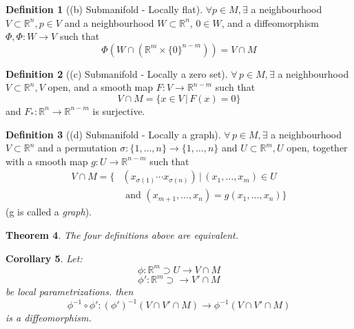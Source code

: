 \documentclass[a4paper,11pt,titlepage]{article}
\numberwithin{equation}{section}
\newtheorem{theorem}{Theorem}[section]
\newtheorem{corollary}[theorem]{Corollary}
\theoremstyle{definition}
\newtheorem{definition}[theorem]{Definition}
\theoremstyle{remark}
\newcommand{\rfield}{\mathbb{R}}
\begin{document}
\begin{definition}[(b) Submanifold - Locally flat]
  $\forall p \in M, \exists$ a neighbourhood $V \subset \rfield^n, p \in V$ and a neighbourhood $W \subset \rfield^n$, $0 \in W$, and a diffeomorphism $\Phi, \Phi \colon W \rightarrow V$ such that
  $$\Phi \left ( W \cap (\rfield^m \times \{0\}^{n-m}) \right ) = V \cap M$$
\end{definition}

\begin{definition}[(c) Submanifold - Locally  a zero set]
$\forall \, p \in M, \exists$ a neighbourhood $V \subset \rfield^n, V$ open, and a smooth map $F \colon V \rightarrow \rfield^{n-m}$ such that
$$V \cap M = \{x \in V \, | \, F(x) = 0\}$$
and $F_* \colon \rfield^n \rightarrow \rfield^{n-m}$ is surjective.
\end{definition}

\begin{definition}[(d) Submanifold - Locally a graph]
  $\forall \, p \in M, \exists$ a neighbourhood $V \subset \rfield^n$ and a permutation $\sigma \colon \{1, \ldots, n\} \rightarrow \{1, \ldots, n\}$ and $U \subset \rfield^m, U$ open, together with a smooth map $g \colon U \rightarrow \rfield^{n-m}$ such that
  \begin{align*}
  V \cap M = \{ &(x_{\sigma(1)} \cdots x_{\sigma(n)}) \, |\, (x_1, \ldots, x_m) \in U \\
   &\text{ and } (x_{m+1}, \ldots, x_n) = g(x_1, \ldots, x_n)\}
\end{align*}
  (g is called a \textit{graph}).
\end{definition}

\begin{theorem}
  The four definitions above are equivalent.
\end{theorem}

\begin{corollary} \label{corsubmanifold}
  Let:
  $$\phi \colon \rfield^m \supset U \rightarrow V \cap M$$
  $$\phi' \colon \rfield^m \supset \rightarrow V' \cap M$$
  be local parametrizations. then
  $$\phi^{-1} \circ \phi' \colon (\phi')^{-1} (V \cap V' \cap M) \rightarrow \phi^{-1}(V \cap V' \cap M)$$
  is a diffeomorphism. %
\end{corollary}
\end{document}
